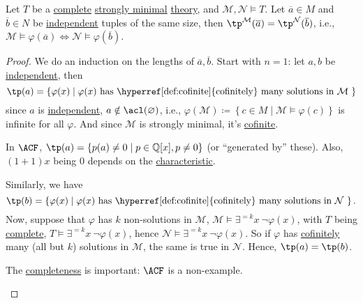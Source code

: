 \begin{lemma}
	Let \(T\) be a \hyperref[def:theory-complete]{complete} \hyperref[def:strongly-minimal]{strongly minimal} \hyperref[def:theory]{theory}, and \(\mathcal{M} , \mathcal{N} \models T\). Let \(\overline{a} \in M\) and \(\overline{b} \in N\) be \hyperref[def:independent]{independent} tuples of the same size, then \(\tp^{\mathcal{M} }(\overline{a} ) = \tp^{\mathcal{N} }(\overline{b} )\), i.e., \(\mathcal{M} \models \varphi (\overline{a} ) \iff \mathcal{N} \models \varphi (\overline{b} )\).
\end{lemma}
\begin{proof}
	We do an induction on the lengths of \(\overline{a} , \overline{b} \). Start with \(n = 1\): let \(a, b\) be \hyperref[def:independent]{independent}, then
	\[
		\tp(a) = \left\{ \varphi (x) \mid \text{\(\varphi (x)\) has \hyperref[def:cofinite]{cofinitely} many solutions in \(\mathcal{M} \) }\right\}
	\]
	since \(a\) is \hyperref[def:independent]{independent}, \(a \notin \acl(\varnothing )\), i.e., \(\varphi (\mathcal{M} ) \coloneqq \left\{ c\in M \mid \mathcal{M} \models \varphi (c) \right\} \) is infinite for all \(\varphi \). And since \(\mathcal{M} \) is strongly minimal, it's \hyperref[def:cofinite]{cofinite}.

	\begin{eg}
		In \(\ACF\), \(\tp(a) = \left\{ p(a) \neq 0 \mid p\in \mathbb{Q} [x], p \neq 0 \right\} \) (or ``generated by'' these). Also, \((1 + 1) x\) being \(0\) depends on the \hyperref[def:characteristic]{characteristic}.
	\end{eg}

	Similarly, we have
	\[
		\tp(b) = \left\{ \varphi (x) \mid \text{\(\varphi (x)\) has \hyperref[def:cofinite]{cofinitely} many solutions in \(\mathcal{N} \) }\right\}.
	\]
	Now, suppose that \(\varphi \) has \(k\) non-solutions in \(\mathcal{M} \), \(\mathcal{M} \models \exists ^{=k} x\ \lnot \varphi (x)\), with \(T\) being \hyperref[def:theory-complete]{complete}, \(T \models \exists ^{=k} x\ \lnot \varphi (x)\), hence \(\mathcal{N} \models \exists ^{=k} x\ \lnot \varphi (x)\). So if \(\varphi \) has \hyperref[def:cofinite]{cofinitely} many (all but \(k\)) solutions in \(\mathcal{M} \), the same is true in \(\mathcal{N} \). Hence, \(\tp(a) = \tp(b)\).

	\begin{eg}
		The \hyperref[def:theory-complete]{completeness} is important: \(\ACF\) is a non-example.
	\end{eg}


\end{proof}
